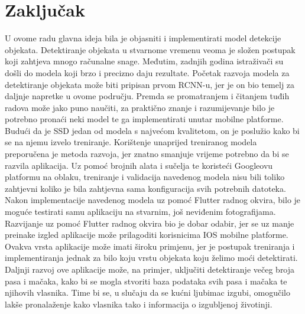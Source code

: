 \chapter{Zaključak}

U ovome radu glavna ideja bila je objasniti i implementirati model detekcije objekata. Detektiranje objekata
u stvarnome vremenu veoma je složen postupak koji zahtjeva mnogo računalne snage. Međutim, zadnjih godina
istraživači su došli do modela koji brzo i precizno daju rezultate. Početak razvoja modela za detektiranje objekata 
može biti pripisan prvom RCNN-u, jer je on bio temelj za daljnje napretke u ovome području. \newline
Premda se promatranjem i čitanjem tuđih radova može jako puno naučiti, za praktično znanje i razumijevanje
bilo je potrebno pronaći neki model te ga implementirati unutar mobilne platforme. Budući da je SSD jedan od modela
s najvećom kvalitetom, on je poslužio kako bi se na njemu izvelo treniranje. Korištenje unaprijed treniranog modela preporučena je 
metoda razvoja, jer znatno smanjuje vrijeme potrebno da bi se razvila aplikacija. Uz pomoć brojnih alata i sučelja te koristeći 
Googleovu platformu na oblaku, treniranje i validacija navedenog modela nisu bili toliko zahtjevni koliko je bila zahtjevna sama 
konfiguracija svih potrebnih datoteka. \newline \newline
Nakon implementacije navedenog modela uz pomoć Flutter radnog okvira, bilo je moguće testirati samu aplikaciju na stvarnim, još
neviđenim fotografijama. Razvijanje uz pomoć Flutter radnog okvira bio je dobar odabir, jer se uz manje preinake izgled aplikacije može prilagoditi 
korisnicima IOS mobilne platforme. Ovakva vrsta aplikacije može imati široku primjenu, jer je postupak treniranja i implementiranja jednak za 
bilo koju vrstu objekata koju želimo moći detektirati. Daljnji razvoj ove aplikacije može, na primjer, uključiti detektiranje večeg broja pasa i mačaka, kako bi se mogla stvoriti baza podataka svih pasa i mačaka te njihovih vlasnika. 
Time bi se, u slučaju da se kućni ljubimac izgubi, omogučilo lakše pronalaženje kako vlasnika tako i informacija o izgubljenoj životinji.